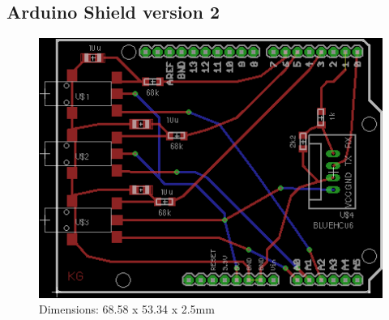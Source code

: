 \subsection{Arduino Shield version 2}
\label{ardshieldpcb2}
\begin{figure}[H]
\centering
\includegraphics[scale = 1.5]{Images/ard_pcb_02}
\\ Dimensions: 68.58 x 53.34 x 2.5mm
\end{figure}







